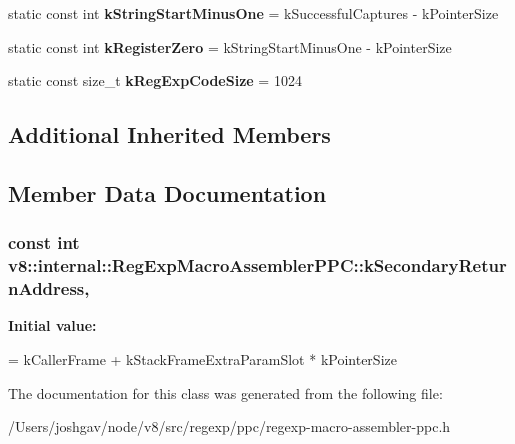 \begin{DoxyCompactItemize}
\item 
static const int {\bfseries k\+String\+Start\+Minus\+One} = k\+Successful\+Captures -\/ k\+Pointer\+Size\hypertarget{classv8_1_1internal_1_1_reg_exp_macro_assembler_p_p_c_a73958ac0f138a9b6f5c0305c0b3792f7}{}\label{classv8_1_1internal_1_1_reg_exp_macro_assembler_p_p_c_a73958ac0f138a9b6f5c0305c0b3792f7}

\item 
static const int {\bfseries k\+Register\+Zero} = k\+String\+Start\+Minus\+One -\/ k\+Pointer\+Size\hypertarget{classv8_1_1internal_1_1_reg_exp_macro_assembler_p_p_c_ad93d8c75baf3b1224682cedf5d8e1d19}{}\label{classv8_1_1internal_1_1_reg_exp_macro_assembler_p_p_c_ad93d8c75baf3b1224682cedf5d8e1d19}

\item 
static const size\+\_\+t {\bfseries k\+Reg\+Exp\+Code\+Size} = 1024\hypertarget{classv8_1_1internal_1_1_reg_exp_macro_assembler_p_p_c_a98b60568f19384c829ddcf32db6c43e4}{}\label{classv8_1_1internal_1_1_reg_exp_macro_assembler_p_p_c_a98b60568f19384c829ddcf32db6c43e4}

\end{DoxyCompactItemize}
\subsection*{Additional Inherited Members}


\subsection{Member Data Documentation}
\subsubsection[{\texorpdfstring{k\+Secondary\+Return\+Address}{kSecondaryReturnAddress}}]{\setlength{\rightskip}{0pt plus 5cm}const int v8\+::internal\+::\+Reg\+Exp\+Macro\+Assembler\+P\+P\+C\+::k\+Secondary\+Return\+Address\hspace{0.3cm}{\ttfamily [static]}, {\ttfamily [private]}}\hypertarget{classv8_1_1internal_1_1_reg_exp_macro_assembler_p_p_c_aff19c9722d83b70411024327748027e7}{}\label{classv8_1_1internal_1_1_reg_exp_macro_assembler_p_p_c_aff19c9722d83b70411024327748027e7}
{\bfseries Initial value\+:}
\begin{DoxyCode}
=
      kCallerFrame + kStackFrameExtraParamSlot * kPointerSize
\end{DoxyCode}


The documentation for this class was generated from the following file\+:\begin{DoxyCompactItemize}
\item 
/\+Users/joshgav/node/v8/src/regexp/ppc/regexp-\/macro-\/assembler-\/ppc.\+h\end{DoxyCompactItemize}
